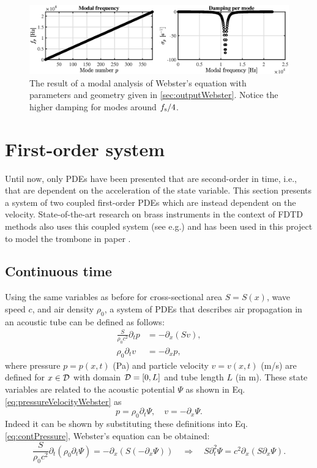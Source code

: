 {\begin{figure}[h]
    \centering
    \includegraphics[width=\textwidth]{figures/resonators/brass/webstersModes.eps}
    \caption{The result of a modal analysis of Webster's equation with parameters and geometry given in \ref{sec:outputWebster}. Notice the higher damping for modes around $f_\text{s}/4$. \label{fig:webstersModes}}
\end{figure}

\section{First-order system}\label{sec:firstOrderSystem}
Until now, only PDEs have been presented that are second-order in time, i.e., that are dependent on the acceleration of the state variable. This section presents a system of two coupled first-order PDEs which are instead dependent on the velocity. State-of-the-art research on brass instruments in the context of FDTD methods also uses this coupled system (see e.g.\cite{Bilbao2016, Harrison2018}) and has been used in this project to model the trombone in paper \citeP[H].

\subsection{Continuous time}
Using the same variables as before for cross-sectional area $S=S(x)$, wave speed $c$, and air density $\rho_0$, a system of PDEs that describes air propagation in an acoustic tube can be defined as follows:
\begin{subequations}\label{eq:firstOrderSystem}
\begin{align}
    \frac{S}{\rho_0 c^2}\partial_t p &= -\partial_x(Sv),\label{eq:contPressure}\\
    \rho_0\partial_tv &= -\partial_xp\label{eq:discVelocity},
\end{align}
\end{subequations}
where pressure $p = p(x,t)$ (Pa) and particle velocity $v = v(x,t)$ (m/s) are defined for $x\in \mathcal{D}$ with domain $\mathcal{D} = [0, L]$ and tube length $L$ (in m). These state variables are related to the acoustic potential $\Psi$ as shown in Eq. \eqref{eq:pressureVelocityWebster} as
\begin{equation}\label{eq:pressureVelocityFirstOrder}
    p = \rho_0\partial_t \Psi, \quad v = -\partial_x\Psi.
\end{equation}  
Indeed it can be shown by substituting these definitions into Eq. \eqref{eq:contPressure}, Webster's equation can be obtained:
\begin{equation}
  \nonumber
        \frac{S}{\rho_0 c^2}\partial_t(\rho_0 \partial_t\Psi) = -\partial_x(S(-\partial_x\Psi))\quad \Longrightarrow \quad S\partial_t^2\Psi = c^2\partial_x(S\partial_x\Psi).
\end{equation}


}
